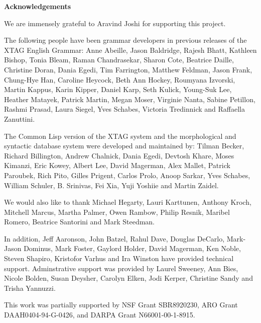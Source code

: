 \pagestyle{plain}
\null\vfil
\begin{center}
{\bf Acknowledgements}
\end{center}
\setcounter{page}{0}

We are immensely grateful to Aravind Joshi for supporting this
project. 

The following people have been grammar developers in previous releases
of the XTAG English Grammar: Anne Abeille, Jason Baldridge, Rajesh
Bhatt, Kathleen Bishop, Tonia Bleam, Raman Chandrasekar, Sharon Cote,
Beatrice Daille, Christine Doran, Dania Egedi, Tim Farrington, Matthew
Feldman, Jason Frank, Chung-Hye Han, Caroline Heycock, Beth Ann
Hockey, Roumyana Izvorski, Martin Kappus, Karin Kipper, Daniel Karp,
Seth Kulick, Young-Suk Lee, Heather Matayek, Patrick Martin, Megan
Moser, Virginie Nanta, Sabine Petillon, Rashmi Prasad, Laura Siegel,
Yves Schabes, Victoria Tredinnick and Raffaella Zanuttini.

The Common Lisp version of the XTAG system and the morphological and
syntactic database system were developed and maintained by: Tilman
Becker, Richard Billington, Andrew Chalnick, Dania Egedi, Devtosh
Khare, Moses Kimanzi, Eric Kowey, Albert Lee, David Magerman, Alex
Mallet, Patrick Paroubek, Rich Pito, Gilles Prigent, Carlos Prolo,
Anoop Sarkar, Yves Schabes, William Schuler, B. Srinivas, Fei Xia,
Yuji Yoshiie and Martin Zaidel.

We would also like to thank Michael Hegarty, Lauri Karttunen, Anthony
Kroch, Mitchell Marcus, Martha Palmer, Owen Rambow, Philip Resnik,
Maribel Romero, Beatrice Santorini and Mark Steedman.

In addition, Jeff Aaronson, John Batzel, Rahul Dave, Douglas DeCarlo,
Mark-Jason Dominus, Mark Foster, Gaylord Holder, David Magerman, Ken
Noble, Steven Shapiro, Kristofor Varhus and Ira Winston have provided
technical support.  Adminstrative support was provided by Laurel
Sweeney, Ann Bies, Nicole Bolden, Susan Deysher, Carolyn Elken, Jodi
Kerper, Christine Sandy and Trisha Yannuzzi.

This work was partially supported by NSF Grant SBR8920230, ARO Grant
DAAH0404-94-G-0426, and DARPA Grant N66001-00-1-8915.

\newpage

